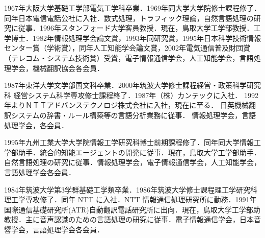 \documentclass{nlp}
\begin{document}
\begin{biography}


{1967年大阪大学基礎工学部電気工学科卒業．1969年同大学大学院修士課程修了．同年日本電信電話公社に入社．数式処理，トラフィック理論，自然言語処理の研究に従事．1996年スタンフォード大学客員教授．現在，鳥取大学工学部教授．工学博士．1982年情報処理学会論文賞，1993年同研究賞，1995年日本科学技術情報センター賞（学術賞），同年人工知能学会論文賞，2002年電気通信普及財団賞（テレコム・システム技術賞）受賞，電子情報通信学会，人工知能学会，言語処理学会，機械翻訳協会各会員．}


{
1987年東洋大学文学部国文科卒業．2000年筑波大学修士課程経営・政策科学研究科
経営システム科学専攻修士課程終了．1987年（株）カンテックに入社．
1992年よりＮＴＴアドバンステクノロジ株式会社に入社，現在に至る．
日英機械翻訳システムの辞書・ルール構築等の言語分析業務に従事．
情報処理学会，言語処理学会，各会員．
}

{1995年九州工業大学大学院情報工学研究科博士前期課程修了．同年同大学情報工学部助手．統合的知能エージェントの開発に従事．現在，鳥取大学工学部助手．自然言語処理の研究に従事．情報処理学会，電子情報通信学会，人工知能学会，言語処理学会各会員．}



{1984年筑波大学第3学群基礎工学類卒業．1986年筑波大学修士課程理工学研究科理工学専攻修了．同年 NTT に入社．NTT 情報通信処理研究所に勤務．1991年国際通信基礎研究所(ATR)自動翻訳電話研究所に出向．現在，鳥取大学工学部助教授．主に音声認識のための言語処理の研究に従事．電子情報通信学会，日本音響学会，言語処理学会各会員．}

\end{biography}
\end{document}
